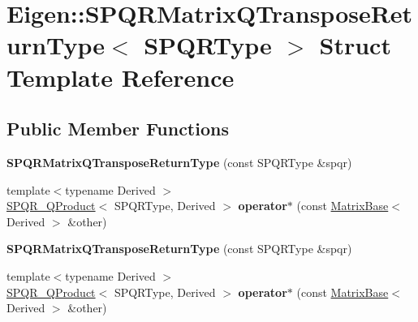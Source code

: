 \hypertarget{struct_eigen_1_1_s_p_q_r_matrix_q_transpose_return_type}{}\section{Eigen\+:\+:S\+P\+Q\+R\+Matrix\+Q\+Transpose\+Return\+Type$<$ S\+P\+Q\+R\+Type $>$ Struct Template Reference}
\label{struct_eigen_1_1_s_p_q_r_matrix_q_transpose_return_type}
\subsection*{Public Member Functions}
\begin{DoxyCompactItemize}
\item 
\mbox{\label{struct_eigen_1_1_s_p_q_r_matrix_q_transpose_return_type_a0c31f8b070b380c416402fb1350999d7}} 
{\bfseries S\+P\+Q\+R\+Matrix\+Q\+Transpose\+Return\+Type} (const S\+P\+Q\+R\+Type \&spqr)
\item 
\mbox{\label{struct_eigen_1_1_s_p_q_r_matrix_q_transpose_return_type_ac34aedd40f4802b50a4272f8e10d7377}} 
{\footnotesize template$<$typename Derived $>$ }\\\hyperlink{struct_eigen_1_1_s_p_q_r___q_product}{S\+P\+Q\+R\+\_\+\+Q\+Product}$<$ S\+P\+Q\+R\+Type, Derived $>$ {\bfseries operator$\ast$} (const \hyperlink{group___core___module_class_eigen_1_1_matrix_base}{Matrix\+Base}$<$ Derived $>$ \&other)
\item 
\mbox{\label{struct_eigen_1_1_s_p_q_r_matrix_q_transpose_return_type_a0c31f8b070b380c416402fb1350999d7}} 
{\bfseries S\+P\+Q\+R\+Matrix\+Q\+Transpose\+Return\+Type} (const S\+P\+Q\+R\+Type \&spqr)
\item 
\mbox{\label{struct_eigen_1_1_s_p_q_r_matrix_q_transpose_return_type_ac34aedd40f4802b50a4272f8e10d7377}} 
{\footnotesize template$<$typename Derived $>$ }\\\hyperlink{struct_eigen_1_1_s_p_q_r___q_product}{S\+P\+Q\+R\+\_\+\+Q\+Product}$<$ S\+P\+Q\+R\+Type, Derived $>$ {\bfseries operator$\ast$} (const \hyperlink{group___core___module_class_eigen_1_1_matrix_base}{Matrix\+Base}$<$ Derived $>$ \&other)
\end{DoxyCompactItemize}

